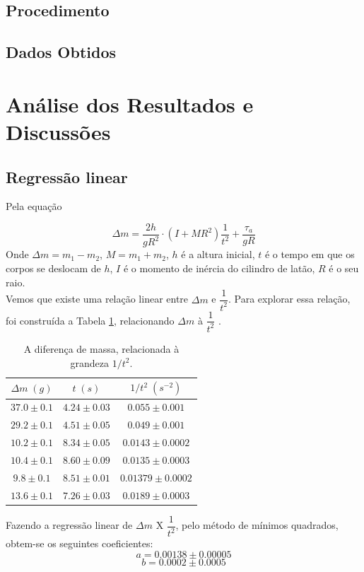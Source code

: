 \documentclass[12pt,a4paper]{article}
\begin{document}
\subsection{Procedimento}





\subsection{Dados Obtidos}


\section{Análise dos Resultados e Discussões}
\subsection{Regressão linear}
Pela equação 

$$\Delta m = \frac{2h}{gR^2} \cdot (I + MR^2)\dfrac{1}{t^2}  + \frac{\tau _a} {gR}$$
Onde $\Delta m = m_1 - m_2$, $ M = m_1 + m_2 $, $h$ é a altura inicial, $t$ é o tempo em que os corpos se deslocam de $h$, $I$ é o momento de inércia do cilindro de latão, $R$ é o seu raio.\\
Vemos que existe uma relação linear entre $\Delta m$ e $ \dfrac{1}{t^2}$. Para explorar essa relação, foi construída a Tabela \ref{linear}, relacionando $\Delta m$ à $ \dfrac{1}{t^2} $ .

\begin{table}[!htbp]
\centering
\def\arraystretch{1.5}
\caption{A diferença de massa, relacionada à grandeza $1/t^2$.}
\begin{tabular}{|c|c|c|}
\hline 
$\Delta m \; (g)$ & $t \; (s)$ & $1/t^2 \; (s^{-2})$ \\ 
\hline 
$37.0 \pm 0.1$ & $4.24 \pm 0.03 $ & $0.055 \pm 0.001 $  \\
\hline
$29.2 \pm 0.1$ & $4.51 \pm 0.05 $ & $0.049 \pm 0.001$ \\
\hline
$10.2 \pm 0.1$ & $8.34 \pm 0.05 $ & $0.0143 \pm 0.0002$\\
\hline
$10.4 \pm 0.1$ & $8.60 \pm 0.09 $ & $ 0.0135 \pm 0.0003 $\\
\hline
$9.8 \pm 0.1$ & $8.51 \pm 0.01 $ & $ 0.01379 \pm 0.0002 $\\
\hline
$13.6 \pm 0.1$ & $7.26 \pm 0.03 $ & $ 0.0189 \pm 0.0003 $ \\
\hline
\end{tabular} 
\label{linear}
\end{table}
Fazendo a regressão linear de $ \Delta m$ X $ \dfrac{1}{t^2} $, pelo método de mínimos quadrados, obtem-se os seguintes coeficientes: 
	$$ a = 0.00138 \pm 0.00005 $$
	$$ b = 0.0002 \pm 0.0005 $$
\end{document}
